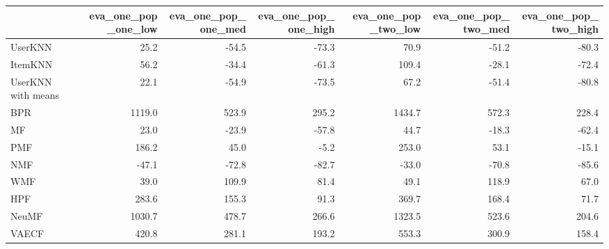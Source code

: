 \begin{tabular}{lrrrrrr}
\toprule
{} &  eva\_one\_pop\_one\_low &  eva\_one\_pop\_one\_med &  eva\_one\_pop\_one\_high &  eva\_one\_pop\_two\_low &  eva\_one\_pop\_two\_med &  eva\_one\_pop\_two\_high \\
\midrule
UserKNN            &                 25.2 &                -54.5 &                 -73.3 &                 70.9 &                -51.2 &                 -80.3 \\
ItemKNN            &                 56.2 &                -34.4 &                 -61.3 &                109.4 &                -28.1 &                 -72.4 \\
UserKNN with means &                 22.1 &                -54.9 &                 -73.5 &                 67.2 &                -51.4 &                 -80.8 \\
BPR                &               1119.0 &                523.9 &                 295.2 &               1434.7 &                572.3 &                 228.4 \\
MF                 &                 23.0 &                -23.9 &                 -57.8 &                 44.7 &                -18.3 &                 -62.4 \\
PMF                &                186.2 &                 45.0 &                  -5.2 &                253.0 &                 53.1 &                 -15.1 \\
NMF                &                -47.1 &                -72.8 &                 -82.7 &                -33.0 &                -70.8 &                 -85.6 \\
WMF                &                 39.0 &                109.9 &                  81.4 &                 49.1 &                118.9 &                  67.0 \\
HPF                &                283.6 &                155.3 &                  91.3 &                369.7 &                168.4 &                  71.7 \\
NeuMF              &               1030.7 &                478.7 &                 266.6 &               1323.5 &                523.6 &                 204.6 \\
VAECF              &                420.8 &                281.1 &                 193.2 &                553.3 &                300.9 &                 158.4 \\
\bottomrule
\end{tabular}
